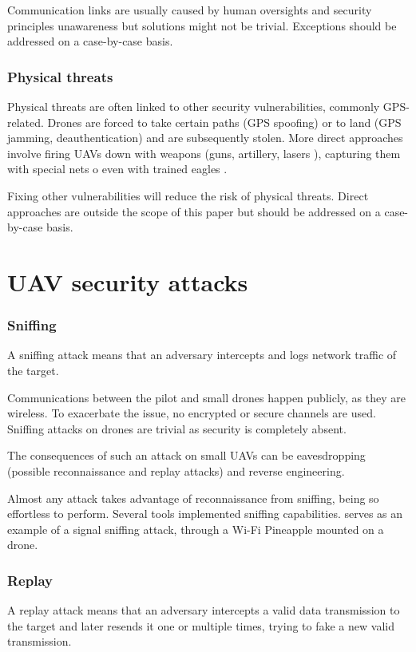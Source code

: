\documentclass[journal]{IEEEtran}
\begin{document}
Communication links are usually caused by human oversights and security principles unawareness but solutions might not be trivial. Exceptions should be addressed on a case-by-case basis.

\subsubsection{Physical threats}
Physical threats are often linked to other security vulnerabilities, commonly GPS-related. Drones are forced to take certain paths (GPS spoofing) or to land (GPS jamming, deauthentication) and are subsequently stolen. More direct approaches involve firing UAVs down with weapons (guns, artillery, lasers \cite{navylaser}), capturing them with special nets \cite{dronenet} o even with trained eagles \cite{droneeagles}.

Fixing other vulnerabilities will reduce the risk of physical threats. Direct approaches are outside the scope of this paper but should be addressed on a case-by-case basis.

\section{UAV security attacks}

\subsubsection{Sniffing}
A sniffing attack means that an adversary intercepts and logs network traffic of the target.

Communications between the pilot and small drones happen publicly, as they are wireless. To exacerbate the issue, no encrypted or secure channels are used. Sniffing attacks on drones are trivial as security is completely absent.

The consequences of such an attack on small UAVs can be eavesdropping (possible reconnaissance and replay attacks) and reverse engineering.

Almost any attack takes advantage of reconnaissance from sniffing, being so effortless to perform. Several tools \cite{wifipineapple} \cite{snoopy} \cite{aircrackng} \cite{skyjack} implemented sniffing capabilities. \cite{smartcitiesdronesecurity} serves as an example of a signal sniffing attack, through a Wi-Fi Pineapple \cite{wifipineapple} mounted on a drone.

\subsubsection{Replay}
A replay attack means that an adversary intercepts a valid data transmission to the target and later resends it one or multiple times, trying to fake a new valid transmission.
\end{document}
